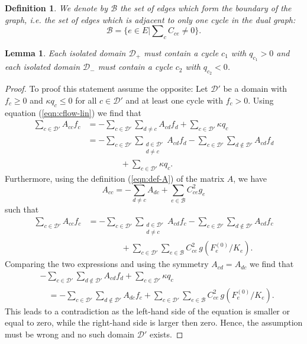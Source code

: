 \documentclass[10pt,aps,pra,twocolumn,superscriptaddress]{revtex4-1}
\newcommand{\be}{\begin{equation}}
\newcommand{\ee}{\end{equation}}
\newcommand{\nn}{\nonumber}
\newcommand{\DD}{\mathcal{D}}
\newtheorem{defn}[thm]{Definition}
\newtheorem{lemma}{Lemma}
\begin{document}
\begin{defn}
We denote by  $\mathcal{B}$ the set of edges which form the boundary of the graph, 
i.e. the set of edges which is adjacent to only one cycle in the dual graph:
\be
   \mathcal{B} = \Big\{ e \in E \Big| \sum \nolimits_{c} C_{ce} \neq 0 \Big\}.
\ee
\end{defn}

\begin{lemma}
Each isolated domain $\DD_+$ must contain a cycle $c_1$ 
with $q_{c_1} > 0$ and each isolated domain $\DD_-$ must contain a
cycle $c_2$ with $q_{c_2} < 0$.
\end{lemma}

\begin{proof}
To proof this statement assume the opposite: Let $\DD'$ be a domain with $f_c \ge 0$ 
and $\kappa q_c \le 0$ for all $c \in \DD'$ and at least one cycle with $f_c > 0$.
Using equation (\ref{eqn:cflow-lin}) we find that 
\begin{align}
    \sum_{c \in \DD'} A_{cc} f_c &= - \sum_{c \in \DD'} \sum_{d \neq c} A_{cd} f_d
           +  \sum_{c \in \DD'} \kappa q_c   \nn \\
       & =  - \sum_{c \in \DD'} \sum_{\substack{d \in \DD' \\ d \neq c}} A_{cd} f_d 
              - \sum_{c \in \DD'} \sum_{d \notin \DD'} A_{cd} f_d \nn \\
      & \qquad \qquad + \sum_{c \in \DD'} \kappa q_c .       
\end{align}
Furthermore, using the definition (\ref{eqn:def-A}) of the matrix $A$, we have
\be
    A_{cc} = - \sum_{d \neq c} A_{dc}    + \sum_{e \in \mathcal{B}} C_{ce}^2 g_e       
\ee
such that
\begin{align}
    \sum_{c \in \DD'} A_{cc} f_c 
       & =  - \sum_{c \in \DD'} \sum_{ \substack{d \in \DD' \\ d \neq c}} A_{cd} f_c 
              - \sum_{c \in \DD'} \sum_{d \notin \DD'} A_{cd} f_c \nn \\
      & \qquad \qquad + \sum_{c \in \DD'} \sum_{e \in \mathcal{B}} C_{ce}^2  \, g(F^{(0)}_e/K_e).     
\end{align}
Comparing the two expressions and using the symmetry $A_{cd} = A_{dc}$
we find that
\begin{align}
  &  - \sum_{c \in \DD'} \sum_{d \notin \DD'} A_{cd} f_d 
                + \sum_{c \in \DD'} \kappa q_c \nn \\
   & \quad =   - \sum_{c \in \DD'} \sum_{d \notin \DD'} A_{dc} f_c 
             + \sum_{c \in \DD'} \sum_{e \in \mathcal{B}} C_{ce}^2 \, g(F^{(0)}_e/K_e).
\end{align}
This leads to a contradiction as the left-hand side of the equation is smaller or 
equal to zero, while the right-hand side is larger then zero. Hence, the assumption 
must be wrong and no such domain $\DD'$ exists. 
\end{proof}
\end{document}
